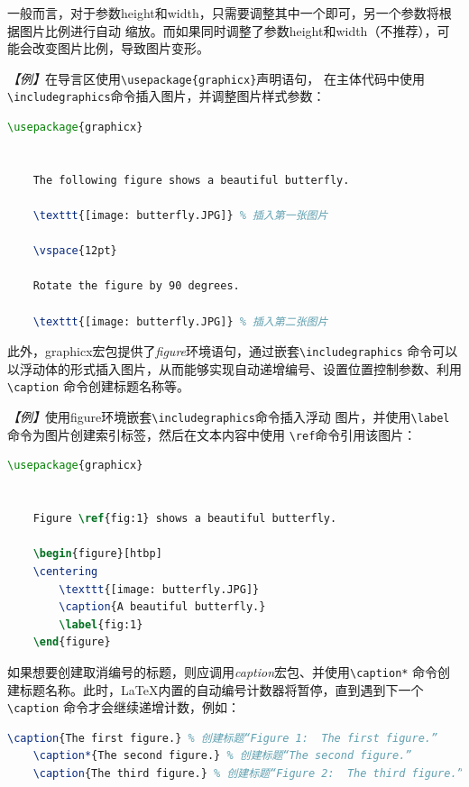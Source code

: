 一般而言，对于参数height和width，只需要调整其中一个即可，另一个参数将根据图片比例进行自动
缩放。而如果同时调整了参数height和width（不推荐），可能会改变图片比例，导致图片变形。

\emph{【例】}在导言区使用\texttt{\textbackslash{}usepackage\{graphicx\}}声明语句，
在主体代码中使用\texttt{\textbackslash{}includegraphics}命令插入图片，并调整图片样式参数：
\begin{lstlisting}[language=TeX]
    \usepackage{graphicx}
    

    The following figure shows a beautiful butterfly.

    \texttt{[image: butterfly.JPG]} % 插入第一张图片

    \vspace{12pt}

    Rotate the figure by 90 degrees.

    \texttt{[image: butterfly.JPG]} % 插入第二张图片
\end{lstlisting}

此外，graphicx宏包提供了\emph{figure}环境语句，通过嵌套\texttt{\textbackslash{}includegraphics}
命令可以以浮动体的形式插入图片，从而能够实现自动递增编号、设置位置控制参数、利用\texttt{\textbackslash{}caption}
命令创建标题名称等。

\emph{【例】}使用figure环境嵌套\texttt{\textbackslash{}includegraphics}命令插入浮动
图片，并使用\texttt{\textbackslash{}label}命令为图片创建索引标签，然后在文本内容中使用
\texttt{\textbackslash{}ref}命令引用该图片：
\begin{lstlisting}[language=TeX]
    \usepackage{graphicx}
    

    Figure \ref{fig:1} shows a beautiful butterfly.

    \begin{figure}[htbp]
    \centering
        \texttt{[image: butterfly.JPG]}
        \caption{A beautiful butterfly.}
        \label{fig:1}
    \end{figure}
\end{lstlisting}

如果想要创建取消编号的标题，则应调用\emph{caption}宏包、并使用\texttt{\textbackslash{}caption*}
命令创建标题名称。此时，LaTeX内置的自动编号计数器将暂停，直到遇到下一个\texttt{\textbackslash{}caption}
命令才会继续递增计数，例如：
\begin{lstlisting}[language=TeX]
    \caption{The first figure.} % 创建标题“Figure 1:  The first figure.”
    \caption*{The second figure.} % 创建标题“The second figure.”
    \caption{The third figure.} % 创建标题“Figure 2:  The third figure.”
\end{lstlisting}

